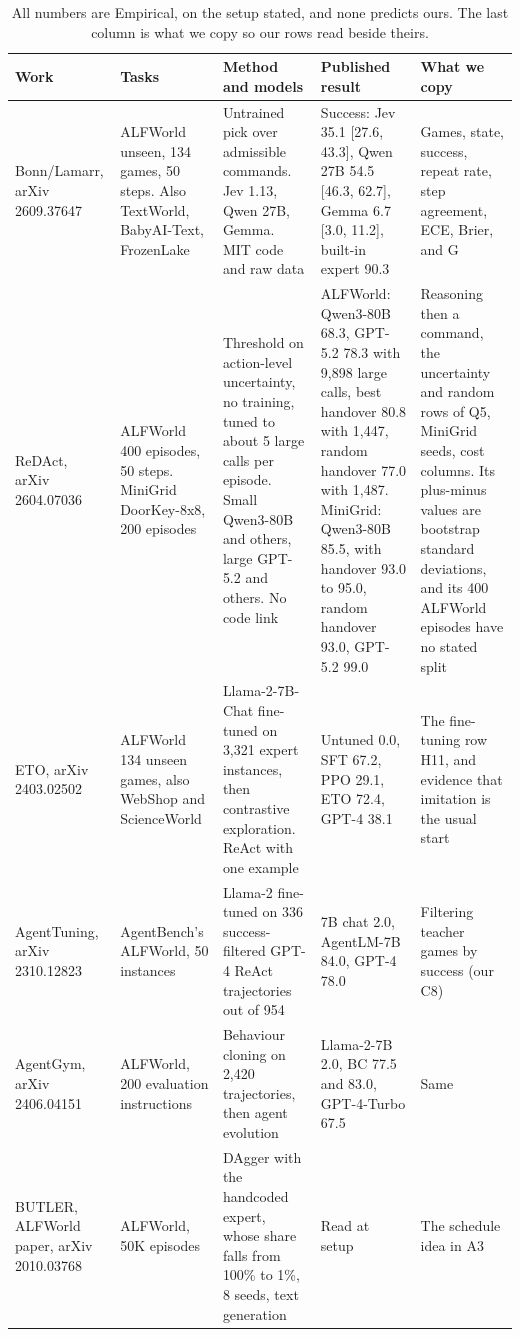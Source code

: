 \documentclass[10pt]{article}
\begin{document}
\begin{table}[H]
\scriptsize
\caption{All numbers are Empirical, on the setup stated, and none predicts ours. The last column is what we copy so our rows read beside theirs.}
\label{t:comp}
\begin{tabularx}{\linewidth}{@{}P{2.3cm} P{4.1cm} P{4.3cm} L P{4.6cm}@{}}
\toprule
Work & Tasks & Method and models & Published result & What we copy \\
\midrule
Bonn/Lamarr, arXiv 2609.37647 & ALFWorld unseen, 134 games, 50 steps. Also TextWorld, BabyAI-Text, FrozenLake & Untrained pick over admissible commands. Jev 1.13, Qwen 27B, Gemma. MIT code and raw data & Success: Jev 35.1 [27.6, 43.3], Qwen 27B 54.5 [46.3, 62.7], Gemma 6.7 [3.0, 11.2], built-in expert 90.3 & Games, state, success, repeat rate, step agreement, ECE, Brier, and G \\
ReDAct, arXiv 2604.07036 & ALFWorld 400 episodes, 50 steps. MiniGrid DoorKey-8x8, 200 episodes & Threshold on action-level uncertainty, no training, tuned to about 5 large calls per episode. Small Qwen3-80B and others, large GPT-5.2 and others. No code link & ALFWorld: Qwen3-80B 68.3, GPT-5.2 78.3 with 9,898 large calls, best handover 80.8 with 1,447, random handover 77.0 with 1,487. MiniGrid: Qwen3-80B 85.5, with handover 93.0 to 95.0, random handover 93.0, GPT-5.2 99.0 & Reasoning then a command, the uncertainty and random rows of Q5, MiniGrid seeds, cost columns. Its plus-minus values are bootstrap standard deviations, and its 400 ALFWorld episodes have no stated split \\
ETO, arXiv 2403.02502 & ALFWorld 134 unseen games, also WebShop and ScienceWorld & Llama-2-7B-Chat fine-tuned on 3,321 expert instances, then contrastive exploration. ReAct with one example & Untuned 0.0, SFT 67.2, PPO 29.1, ETO 72.4, GPT-4 38.1 & The fine-tuning row H11, and evidence that imitation is the usual start \\
AgentTuning, arXiv 2310.12823 & AgentBench's ALFWorld, 50 instances & Llama-2 fine-tuned on 336 success-filtered GPT-4 ReAct trajectories out of 954 & 7B chat 2.0, AgentLM-7B 84.0, GPT-4 78.0 & Filtering teacher games by success (our C8) \\
AgentGym, arXiv 2406.04151 & ALFWorld, 200 evaluation instructions & Behaviour cloning on 2,420 trajectories, then agent evolution & Llama-2-7B 2.0, BC 77.5 and 83.0, GPT-4-Turbo 67.5 & Same \\
BUTLER, ALFWorld paper, arXiv 2010.03768 & ALFWorld, 50K episodes & DAgger with the handcoded expert, whose share falls from 100\% to 1\%, 8 seeds, text generation & Read at setup & The schedule idea in A3 \\

\end{tabularx}
\end{table}
\end{document}
